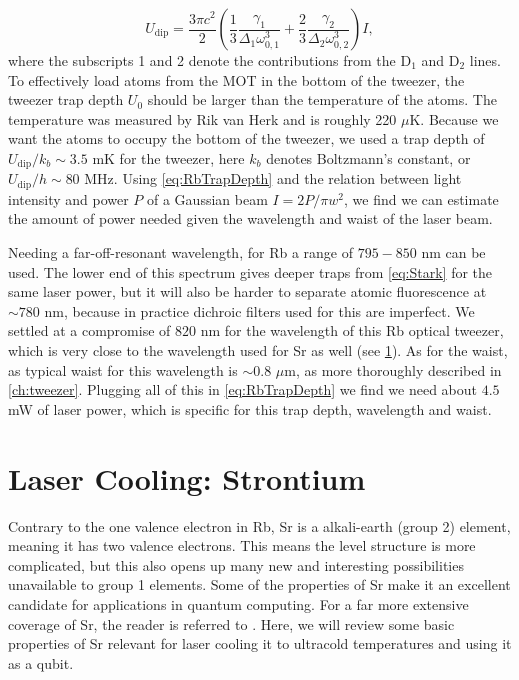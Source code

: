 \begin{equation}\label{eq:RbTrapDepth}
    U_{\text{dip}} = \frac{3\pi c^2}{2} \left(
    \frac{1}{3}\frac{\gamma_1}{\Delta_1 \omega_{0,1}^3} + \frac{2}{3}\frac{ \gamma_2}{\Delta_2 \omega_{0,2}^3} 
    \right) I,
\end{equation}
where the subscripts 1 and 2 denote the contributions from the D$_1$ and D$_2$ lines. 
To effectively load atoms from the MOT in the bottom of the tweezer, the tweezer trap depth $U_0$ should be larger than the temperature of the atoms. 
The temperature was measured by Rik van Herk \cite{Herk2022} and is roughly 220 $\mu$K.
Because we want the atoms to occupy the bottom of the tweezer, we used a trap depth of $U_{\text{dip}} /k_b \sim 3.5$ mK for the tweezer, here $k_b$ denotes Boltzmann's constant, or $U_{\text{dip}} / h \sim 80$ MHz.
Using \cref{eq:RbTrapDepth} and the relation between light intensity and power $P$ of a Gaussian beam $I = 2P/\pi w^2$, we find we can estimate the amount of power needed given the wavelength and waist of the laser beam. 

Needing a far-off-resonant wavelength, for Rb a range of $795 - 850$ nm can be used.
The lower end of this spectrum gives deeper traps from \cref{eq:Stark} for the same laser power, but it will also be harder to separate atomic fluorescence at $\sim 780$ nm, because in practice dichroic filters used for this are imperfect.
We settled at a compromise of $820$ nm for the wavelength of this Rb optical tweezer, which is very close to the wavelength used for Sr as well (see \cref{sec:Sr}). As for the waist, as typical waist for this wavelength is $\sim 0.8$ $\mu$m, as more thoroughly described in \cref{ch:tweezer}. Plugging all of this in \cref{eq:RbTrapDepth} we find we need about $4.5$ mW of laser power, which is specific for this trap depth, wavelength and waist.


\section{Laser Cooling: Strontium}\label{sec:Sr}

Contrary to the one valence electron in \ac{Rb}, \ac{Sr} is a alkali-earth (group 2) element, meaning it has two valence electrons.
This means the level structure is more complicated, but this also opens up many new and interesting possibilities unavailable to group 1 elements.
Some of the properties of Sr make it an excellent candidate for applications in quantum computing.
For a far more extensive coverage of Sr, the reader is referred to \cite{Stellmer2013}. 
Here, we will review some basic properties of Sr relevant for laser cooling it to ultracold temperatures and using it as a qubit.

